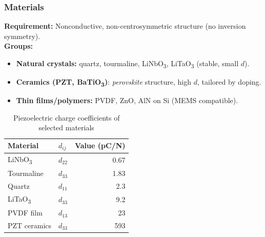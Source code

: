 \begin{frame}
	\frametitle{Materials}
    \textbf{Requirement:} Nonconductive, non-centrosymmetric structure (no inversion symmetry).\\[1mm]
    \textbf{Groups:}
    \begin{itemize}
        \item \textbf{Natural crystals:} quartz, tourmaline, LiNbO\textsubscript{3}, LiTaO\textsubscript{3} (stable, small $d$).
        \item \textbf{Ceramics (PZT, BaTiO\textsubscript{3})}: \emph{perovskite} structure, high $d$, tailored by doping.
        \item \textbf{Thin films/polymers:} PVDF, ZnO, AlN on Si (MEMS compatible).
    \end{itemize}
    \medskip
    \begin{table}
        \centering
        \begin{tabular}{@{}llr@{}}
            \toprule
            Material                 &   $d_{ij}$   &   Value (\si{pC/N}) \\
            \midrule  
            LiNbO\textsubscript{3}   &   $d_{22}$   &   0.67 \\
            Tourmaline               &   $d_{33}$   &   1.83 \\
            Quartz                   &   $d_{11}$   &   2.3 \\
            LiTaO\textsubscript{3}   &   $d_{33}$   &   9.2 \\
            PVDF film                &   $d_{13}$   &   23 \\
            PZT ceramics             &   $d_{33}$   &   593 \\
            \bottomrule
        \end{tabular}
        \caption{Piezoelectric charge coefficients of selected materials}\label{tab:piezoelectric_coefficients}
    \end{table}
\end{frame}

